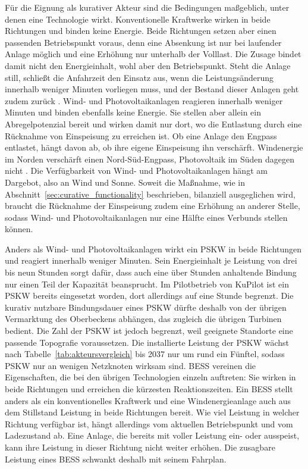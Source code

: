 \begin{table}[tbp]
\begin{tabular}
    \end{tabular}
\end{table}

Für die Eignung als kurativer Akteur sind die Bedingungen maßgeblich, unter denen eine Technologie wirkt.
Konventionelle Kraftwerke wirken in beide Richtungen und binden keine Energie.
Beide Richtungen setzen aber einen passenden Betriebspunkt voraus, denn eine Absenkung ist nur bei laufender Anlage möglich und eine Erhöhung nur unterhalb der Volllast.
Die Zusage bindet damit nicht den Energieinhalt, wohl aber den Betriebspunkt.
Steht die Anlage still, schließt die Anfahrzeit den Einsatz aus, wenn die Leistungsänderung innerhalb weniger Minuten vorliegen muss, und der Bestand dieser Anlagen geht zudem zurück \cite{innosys_2030_gesamtverbund_innovationen_2021, bundesministerium_fur_wirtschaft_und_klimaschutz_strommarktdesign_2024}.
Wind- und Photovoltaikanlagen reagieren innerhalb weniger Minuten und binden ebenfalls keine Energie.
Sie stellen aber allein ein Abregelpotenzial bereit und wirken damit nur dort, wo die Entlastung durch eine Rücknahme von Einspeisung zu erreichen ist.
Ob eine Anlage den Engpass entlastet, hängt davon ab, ob ihre eigene Einspeisung ihn verschärft.
Windenergie im Norden verschärft einen Nord-Süd-Engpass, Photovoltaik im Süden dagegen nicht \cite{lindner_operation_2023, vde_etg_flexibilisierung_2023}.
Die Verfügbarkeit von Wind- und Photovoltaikanlagen hängt am Dargebot, also an Wind und Sonne.
Soweit die Maßnahme, wie in Abschnitt~\ref{sec:curative_functionality} beschrieben, bilanziell ausgeglichen wird, braucht die Rücknahme der Einspeisung zudem eine Erhöhung an anderer Stelle, sodass Wind- und Photovoltaikanlagen nur eine Hälfte eines Verbunds stellen können.

Anders als Wind- und Photovoltaikanlagen wirkt ein \ac{PSKW} in beide Richtungen und reagiert innerhalb weniger Minuten.
Sein Energieinhalt je Leistung von drei bis neun Stunden sorgt dafür, dass auch eine über Stunden anhaltende Bindung nur einen Teil der Kapazität beansprucht.
Im Pilotbetrieb von KuPilot ist ein \ac{PSKW} bereits eingesetzt worden, dort allerdings auf eine Stunde begrenzt.
Die kurativ nutzbare Bindungsdauer eines \ac{PSKW} dürfte deshalb von der übrigen Vermarktung des Oberbeckens abhängen, das zugleich die übrigen Turbinen bedient.
Die Zahl der \ac{PSKW} ist jedoch begrenzt, weil geeignete Standorte eine passende Topografie voraussetzen.
Die installierte Leistung der \ac{PSKW} wächst nach Tabelle~\ref{tab:akteursvergleich} bis 2037 nur um rund ein Fünftel, sodass \ac{PSKW} nur an wenigen Netzknoten wirksam sind.
\ac{BESS} vereinen die Eigenschaften, die bei den übrigen Technologien einzeln auftreten: Sie wirken in beide Richtungen und erreichen die kürzesten Reaktionszeiten.
Ein \ac{BESS} stellt anders als ein konventionelles Kraftwerk und eine Windenergieanlage auch aus dem Stillstand Leistung in beide Richtungen bereit.
Wie viel Leistung in welcher Richtung verfügbar ist, hängt allerdings vom aktuellen Betriebspunkt und vom Ladezustand ab.
Eine Anlage, die bereits mit voller Leistung ein- oder ausspeist, kann ihre Leistung in dieser Richtung nicht weiter erhöhen.
Die zusagbare Leistung eines \ac{BESS} schwankt deshalb mit seinem Fahrplan.

